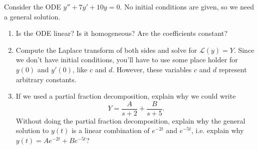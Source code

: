 \begin{problem}
 Consider the ODE $y''+7y'+10y=0$.  No initial conditions are given, so we need a general solution.
 \begin{enumerate}
 \item Is the ODE linear? Is it homogeneous? Are the coefficients constant?
 \item Compute the Laplace transform of both sides and solve for $\mathscr{L}(y) = Y$. Since we don't have initial conditions, you'll have to use some place holder for $y(0)$ and $y'(0)$, like $c$ and $d$.  However, these variables $c$ and $d$ represent arbitrary constants.
 \item If we used a partial fraction decomposition, explain why we could write $$Y=\frac{A}{s+2}+\frac{B}{s+5}.$$ Without doing the partial fraction decomposition, explain why the general solution to $y(t)$ is a linear combination of $e^{-2t}$ and $e^{-5t}$, i.e. explain why $y(t)=Ae^{-2t}+Be^{-5t}$? 
\end{enumerate}
\end{problem}






\mysubsection{\ideaD}

